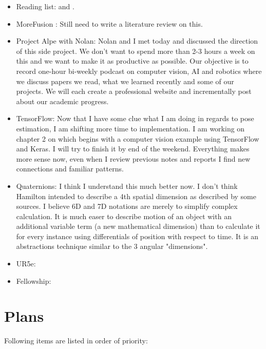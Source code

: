 \documentclass[11pt]{article}
\begin{document}
\begin{itemize}
	\item Reading list: \cite{lampinen2001bayesian} and \cite{li2019survey}.

	\item MoreFusion \cite{MoreFusion}: Still need to write a literature review on this.

	\item Project Alpe with Nolan: Nolan and I met today and discussed the direction of this side project. We don't want to spend more than 2-3 hours a week on this and we want to make it as productive as possible. Our objective is to record one-hour bi-weekly podcast on computer vision, AI and robotics where we discuss papers we read, what we learned recently and some of our projects. We will each create a professional website and incrementally post about our academic progress.

	\item TensorFlow: Now that I have some clue what I am doing in regards to pose estimation, I am shifting more time to implementation. I am working on chapter 2 on \cite{planche2019hands} which begins with a computer vision example using TensorFlow and Keras. I will try to finish it by end of the weekend. Everything makes more sense now, even when I review previous notes and reports I find new connections and familiar patterns.

	\item Quaternions: I think I understand this much better now. I don't think Hamilton intended to describe a 4th spatial dimension as described by some sources. I believe 6D and 7D notations are merely to simplify complex calculation. It is much easer to describe motion of an object with an additional variable term (a new mathematical dimension) than to calculate it for every instance using differentials of position with respect to time. It is an abstractions technique similar to the 3 angular "dimensions".

	\item UR5e:

	\item Fellowship:




\end{itemize}

\newpage

\section{Plans}
Following items are listed in order of priority:
\end{document}

